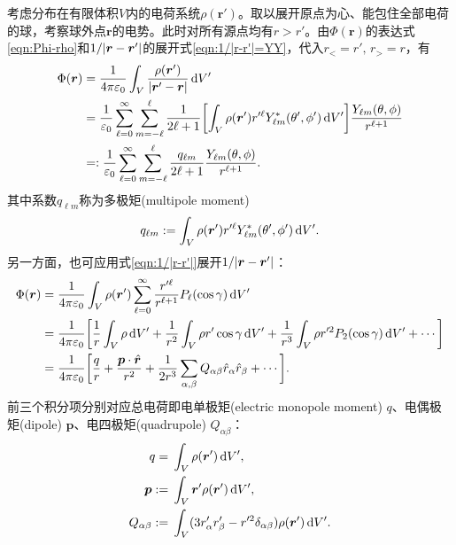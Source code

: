 考虑分布在有限体积$V$内的电荷系统$\rho(\bm r')$。取以展开原点为心、能包住全部电荷的球，考察球外点$\bm r$的电势。此时对所有源点均有$r > r'$。由$\Phi(\bm r)$的表达式\eqref{eqn:Phi-rho}和$1/\lvert\bm r - \bm r'\rvert$的展开式\eqref{eqn:1/|r-r'|=YY}，代入$r_< = r',\,r_> = r$，有
\begin{align}
    \notag
    \Phi(\bm r) &= \frac1{4\pi\varepsilon_0}\int_V\frac{\rho(\bm r')}{\lvert\bm r' - \bm r\rvert}\mathop{}\!\mathrm{d} V'\\
    \notag
    &= \frac1{\varepsilon_0}\sum_{\ell=0}^\infty\sum_{m=-\ell}^\ell\frac1{2\ell + 1}\biggl[\int_V\rho(\bm r'){r'^\ell}Y^\ast_{\ell m}(\theta',\phi')\mathop{}\!\mathrm{d} V'\biggr]\frac{Y_{\ell m}(\theta,\phi)}{r^{\ell+1}}\\
    \label{eqn:Phi multipole}
    &=: \frac1{\varepsilon_0}\sum_{\ell=0}^\infty\sum_{m=-\ell}^\ell\frac{q_{\ell m}}{2\ell + 1}\frac{Y_{\ell m}(\theta,\phi)}{r^{\ell+1}}.
\end{align}
其中系数$q_{\ell m}$称为多极矩(multipole moment)
\begin{equation}
    q_{\ell m} := \int_V\rho(\bm r'){r'^\ell}Y^\ast_{\ell m}(\theta',\phi')\mathop{}\!\mathrm{d} V'.
\end{equation}
另一方面，也可应用式\eqref{eqn:1/|r-r'|}展开$1/\lvert\bm r - \bm r'\rvert$：
\begin{align}
    \notag
    \Phi(\bm r) &= \frac1{4\pi\varepsilon_0}\int_V\rho(\bm r')\sum_{\ell=0}^\infty\frac{r'^\ell}{r^{\ell+1}}P_\ell(\cos\gamma)\mathop{}\!\mathrm{d} V'\\
    \notag
    &= \frac1{4\pi\varepsilon_0}\biggl[\frac1r\int_V\rho\mathop{}\!\mathrm{d} V' + \frac1{r^2}\int_V\rho r'\cos\gamma\mathop{}\!\mathrm{d} V' + \frac1{r^3}\int_V\rho r'^2P_2(\cos\gamma)\mathop{}\!\mathrm{d} V' + \cdots\biggr]\\
    \label{eqn:legendre multipole}
    &= \frac1{4\pi\varepsilon_0}\biggl[\frac qr + \frac{\bm p \cdot \mathop{}\!\hat{\bm{r}}}{r^2} + \frac1{2r^3}\sum_{\alpha,\beta}Q_{\alpha\beta}\hat r_\alpha\hat r_\beta + \cdots\biggr].
\end{align}
前三个积分项分别对应总电荷即电单极矩(electric monopole moment) $q$、电偶极矩(dipole) $\bm p$、电四极矩(quadrupole) $Q_{\alpha\beta}$：
\begin{subequations}
    \begin{align}
        q = {}&\int_V\rho(\bm r')\mathop{}\!\mathrm{d} V',\\
        \bm p := {}&\int_V\bm r'\rho(\bm r')\mathop{}\!\mathrm{d} V',\\
        Q_{\alpha\beta} := {}&\int_V(3r_\alpha'r_\beta' - r'^2\delta_{\alpha\beta})\rho(\bm r')\mathop{}\!\mathrm{d} V'.
    \end{align}
\end{subequations}

